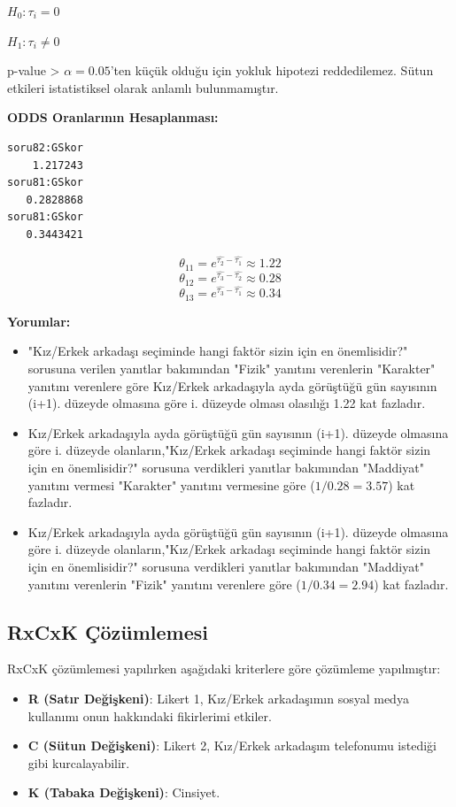 \documentclass{article}
\begin{document}
$H_0: \tau_i = 0$ 

$H_1: \tau_i \neq 0$

\vspace{10pt}
p-value > $\alpha=0.05$'ten küçük olduğu için yokluk hipotezi reddedilemez. Sütun etkileri istatistiksel olarak anlamlı bulunmamıştır.

\vspace{10pt}
\textbf{ODDS Oranlarının Hesaplanması:} \\
\begin{verbatim}
soru82:GSkor 
    1.217243 
soru81:GSkor 
   0.2828868 
soru81:GSkor 
   0.3443421 
\end{verbatim}
$$\theta_{11} = e^{\hat{\tau_2} - \hat{\tau_1}} \approx 1.22$$ 
$$\theta_{12} = e^{\hat{\tau_3} - \hat{\tau_2}} \approx 0.28$$  
$$\theta_{13} = e^{\hat{\tau_3} - \hat{\tau_1}} \approx 0.34$$  

\textbf{Yorumlar:} \\
\begin{itemize}
    \item "Kız/Erkek arkadaşı seçiminde hangi faktör sizin için en önemlisidir?" sorusuna verilen yanıtlar bakımından "Fizik" yanıtını verenlerin "Karakter" yanıtını verenlere göre Kız/Erkek arkadaşıyla ayda görüştüğü gün sayısının (i+1). düzeyde olmasına göre i. düzeyde olması olasılığı 1.22 kat fazladır.

    \item Kız/Erkek arkadaşıyla ayda görüştüğü gün sayısının (i+1). düzeyde olmasına göre i. düzeyde olanların,"Kız/Erkek arkadaşı seçiminde hangi faktör sizin için en önemlisidir?" sorusuna verdikleri yanıtlar bakımından "Maddiyat" yanıtını vermesi "Karakter" yanıtını vermesine göre ($1/0.28=3.57$) kat fazladır.

    \item Kız/Erkek arkadaşıyla ayda görüştüğü gün sayısının (i+1). düzeyde olmasına göre i. düzeyde olanların,"Kız/Erkek arkadaşı seçiminde hangi faktör sizin için en önemlisidir?" sorusuna verdikleri yanıtlar bakımından "Maddiyat" yanıtını verenlerin "Fizik" yanıtını verenlere göre ($1/0.34=2.94$) kat fazladır.
\end{itemize}

\vspace{20pt}
\subsection{RxCxK Çözümlemesi}
RxCxK çözümlemesi yapılırken aşağıdaki kriterlere göre çözümleme yapılmıştır:
\begin{itemize}
    \item \textbf{R (Satır Değişkeni)}: Likert 1, Kız/Erkek arkadaşımın  sosyal medya kullanımı onun hakkındaki fikirlerimi etkiler.
    \item \textbf{C (Sütun Değişkeni)}: Likert 2, Kız/Erkek arkadaşım telefonumu istediği gibi kurcalayabilir.
    \item \textbf{K (Tabaka Değişkeni)}: Cinsiyet.
\end{itemize}
\end{document}
